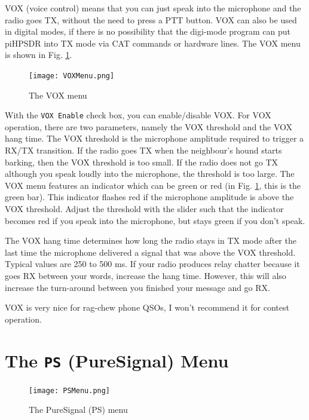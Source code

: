 \documentclass[12pt]{book}
\def\rett#1{\texttt{\color{red}#1}}
\def\pH{pi\-HPSDR\xspace}
\begin{document}
VOX (voice control) means that you can just speak into the microphone and the
radio goes TX, without the need to press a PTT button. VOX can also be used
in digital modes, if there is no possibility that the digi-mode program can
put \pH into TX mode via CAT commands or hardware lines. The VOX menu
is shown in Fig. \ref{fig:VOXMenu}.

\begin{figure}[ht]
\center
\texttt{[image: VOXMenu.png]}
\caption{The VOX menu}
\label{fig:VOXMenu}
\end{figure}

With the \rett{VOX Enable} check box, you can enable/disable VOX. For VOX operation,
there are two parameters, namely the VOX threshold and the VOX hang time. The VOX threshold
is the microphone amplitude required to trigger a RX/TX transition. If the radio goes TX
when the neighbour's hound starts barking, then the VOX threshold is too small. If the radio
does not go TX  although you speak loudly into the microphone, the threshold is too large.
The VOX menu features an indicator which can be green or red (in Fig. \ref{fig:VOXMenu}, this
is the green bar). This indicator flashes red if the microphone amplitude is above the VOX
threshold. Adjust the threshold with the slider such that the indicator becomes red if  you
speak into the microphone, but stays green if you don't speak.

The VOX hang time determines how long the radio stays in TX mode after the last time the
microphone delivered a signal that was above the VOX threshold. Typical values are 250 to
500 ms. If your radio produces relay chatter because it goes RX between your words,
increase the hang time. However, this will also increase the turn-around between you finished
your message and go RX.

VOX is very nice for rag-chew phone QSOs, I won't recommend it for contest operation.

\section{The \texttt{PS} (PureSignal) Menu}

\begin{figure}[ht]
\center
\texttt{[image: PSMenu.png]}
\caption{The PureSignal (PS) menu}
\label{fig:PSMenu}
\end{figure}
\end{document}
